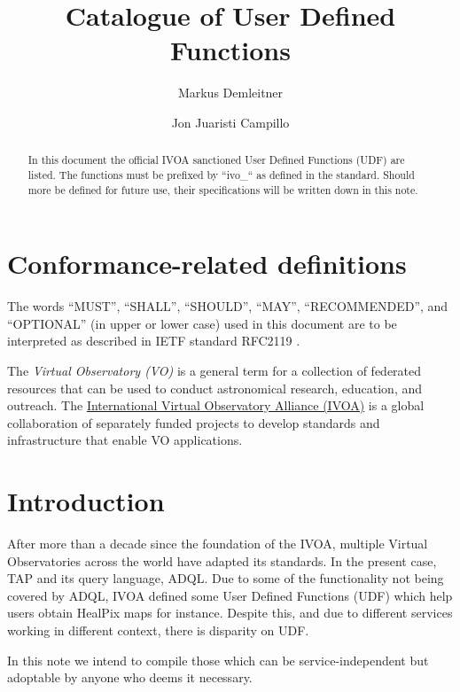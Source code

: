 \documentclass[11pt,a4paper]{ivoa}
\title{Catalogue of User Defined Functions}
\author{Markus Demleitner}
\author{Jon Juaristi Campillo}
\begin{document}
\begin{abstract}
In this document the official IVOA sanctioned User Defined Functions
(UDF) are listed. The functions must be prefixed by ``ivo\_`` as
defined in the standard. Should more be defined for future use, their
specifications will be written down in this note.
\end{abstract}




\section*{Conformance-related definitions}

The words ``MUST'', ``SHALL'', ``SHOULD'', ``MAY'', ``RECOMMENDED'', and
``OPTIONAL'' (in upper or lower case) used in this document are to be
interpreted as described in IETF standard RFC2119 \citep{std:RFC2119}.

The \emph{Virtual Observatory (VO)} is a
general term for a collection of federated resources that can be used
to conduct astronomical research, education, and outreach.
The \href{http://www.ivoa.net}{International
Virtual Observatory Alliance (IVOA)} is a global
collaboration of separately funded projects to develop standards and
infrastructure that enable VO applications.


\section{Introduction}

After more than a decade since the foundation of the IVOA, multiple
Virtual Observatories across the world have adapted its standards. In
the present case, TAP and its query language, ADQL. Due to some of the
functionality not being covered by ADQL, IVOA defined some User Defined
Functions (UDF) which help users obtain HealPix maps for instance.
Despite this, and due to different services working in different
context, there is disparity on UDF.

In this note we intend to compile those which can be service-independent
but adoptable by anyone who deems it necessary.

\end{document}
